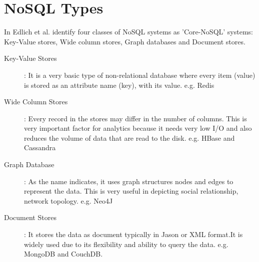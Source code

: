 \documentclass[sigconf]{acmart}
\begin{document}
\section{NoSQL Types}
In \cite{edmodel} Edlich et al. identify four classes of NoSQL systems as 'Core-NoSQL' systems: Key-Value stores, Wide column stores, Graph databases and Document stores.	
\begin{description}

\item[Key-Value Stores]: It is a very basic type of non-relational database where every item (value) is stored as an attribute name (key), with its value. e.g. Redis

\item[Wide Column Stores]: Every record in the stores may differ in the number of columns. This is very important factor for analytics because it needs very low I/O and also reduces the volume of data that are read to the disk. e.g. HBase and Cassandra

\item[Graph Database]: As the name indicates, it uses graph structures nodes and edges to represent the data. This is very useful in depicting social relationship, network topology. e.g. Neo4J 

\item[Document Stores]: It stores the data as document typically in Jason or XML format.It is widely used due to its flexibility and ability to query the data. e.g. MongoDB and CouchDB.
\end{description}
\end{document}
